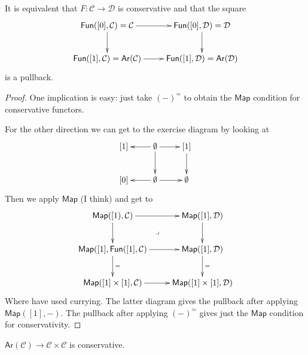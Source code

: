 \begin{proposition}
\label{proposition-characterization-conservative}
It is equivalent that $F:\mathcal{C} \to \mathcal{D}$
is conservative and that the square
$$
\xymatrix{
\mathsf{Fun}([0],\mathcal{C})=\mathcal{C}\ar[r]\ar[d]&
\mathsf{Fun}([0],\mathcal{D})=\mathcal{D}\ar[d]\\
\mathsf{Fun}([1],\mathcal{C})=\mathsf{Ar}(\mathcal{C})\ar[r]
&\mathsf{Fun}([1],\mathcal{D})=\mathsf{Ar}(\mathcal{D})
}
$$
is a pullback.
\end{proposition}

\begin{proof}
One implication is easy: just take
$(-)^\simeq$ to obtain the $\mathsf{Map}$ condition
for conservative functors.

For the other direction we can get to
the exercise diagram by looking at
$$
\xymatrix{
[1]&\emptyset\ar[l]\ar[r]\ar[d]& [1]\ar[d]\\
[0]&\emptyset\ar[l]\ar[r]&\emptyset
}
$$
Then we apply $\mathsf{Map}$ (I think) and get to
$$
\xymatrix{
\mathsf{Map}([1),\mathcal{C})\ar[r]\ar[d]\ar@{}[dr]|-{\lrcorner}&
\mathsf{Map}([1],\mathcal{D})\ar[d]\\
\mathsf{Map}([1],\mathsf{Fun}([1],\mathcal{C})\ar[r]\ar[d]^{=}&
\mathsf{Map}([1],\mathcal{D})\ar[d]^=\\
\mathsf{Map}([1]\times[1],\mathcal{C})\ar[r]&
\mathsf{Map}([1]\times[1],\mathcal{D})
}
$$
Where have used currying.
The latter diagram gives the pullback
after applying $\mathsf{Map}([1],-)$.
The pullback after applying $(-)^\simeq$
gives just the $\mathsf{Map}$ condition
for conservativity.
\end{proof}

\begin{proposition}
\label{proposition-arrow-functor-is-conservative}
$\mathsf{Ar}(\mathcal{C})\to \mathcal{C} \times \mathcal{C}$
is conservative.
\end{proposition}

